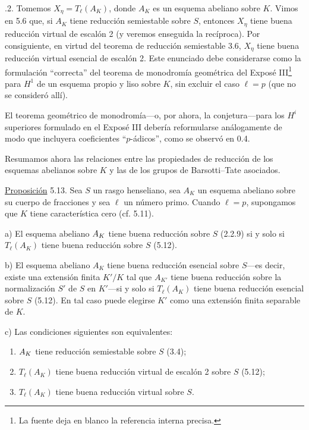 \medskip
{}.2. Tomemos $X_\eta=T_\ell(A_K)$, donde $A_K$ es un esquema
abeliano sobre $K$. Vimos en 5.6 que, si $A_K$ tiene reducción
semiestable sobre $S$, entonces $X_\eta$ tiene buena reducción virtual
de escalón 2 (y veremos enseguida la recíproca). Por consiguiente, en
virtud del teorema de reducción semiestable 3.6, $X_\eta$ tiene buena
reducción virtual esencial de escalón 2. Este enunciado debe
considerarse como la formulación ``correcta'' del teorema de monodromía
geométrica del Exposé III\footnote{La fuente deja en blanco la
referencia interna precisa.} para $H^1$ de un esquema propio y liso
sobre $K$, sin excluir el caso $\ell=p$ (que no se consideró allí).


El teorema geométrico de monodromía---o, por ahora, la conjetura---para
los $H^i$ superiores formulado en el Exposé III debería reformularse
análogamente de modo que incluyera coeficientes ``$p$-ádicos'', como se
observó en 0.4.

Resumamos ahora las relaciones entre las propiedades de reducción de
los esquemas abelianos sobre $K$ y las de los grupos de
Barsotti--Tate asociados.

\medskip
\noindent
\underline{Proposición} 5.13. Sea $S$ un rasgo henseliano, sea $A_K$
un esquema abeliano sobre su cuerpo de fracciones y sea $\ell$ un
número primo. Cuando $\ell=p$, supongamos que $K$ tiene característica
cero (cf. 5.11).

\smallskip
\noindent
a) El esquema abeliano $\sisi{A}{A_K}$ tiene buena reducción sobre $S$
(2.2.9) si y solo si $T_\ell(A_K)$ tiene buena reducción sobre $S$
(5.12).

\smallskip
\noindent
b) El esquema abeliano $A_K$ tiene buena reducción esencial sobre
$S$---es decir, existe una extensión finita $K'/K$ tal que $A_{K'}$
tiene buena reducción sobre la normalización $S'$ de $S$ en $K'$---si
y solo si $T_\ell(A_K)$ tiene buena reducción esencial sobre $S$
(5.12). En tal caso puede elegirse $K'$ como una extensión finita
separable de $K$.

\smallskip
\noindent
c) Las condiciones siguientes son equivalentes:
\begin{enumerate}
\item[1)] $\sisi{A}{A_K}$ tiene reducción semiestable sobre $S$ (3.4);
\item[2)] $T_\ell(A_K)$ tiene buena reducción virtual de escalón 2
  sobre $S$ (5.12);
\item[3)] $T_\ell(A_K)$ tiene buena reducción virtual sobre $S$.
\end{enumerate}

